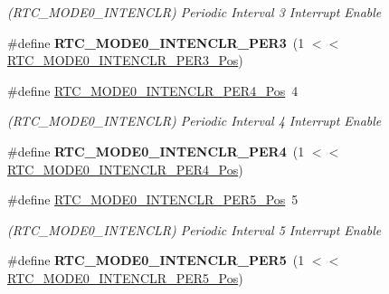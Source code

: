 \begin{DoxyCompactItemize}
\begin{DoxyCompactList}\small\item\em (R\+T\+C\+\_\+\+M\+O\+D\+E0\+\_\+\+I\+N\+T\+E\+N\+C\+L\+R) Periodic Interval 3 Interrupt Enable \end{DoxyCompactList}\item 
\hypertarget{group___s_a_m_l21___r_t_c_gac679977973e031111f5346b732fc22e0}{}\#define {\bfseries R\+T\+C\+\_\+\+M\+O\+D\+E0\+\_\+\+I\+N\+T\+E\+N\+C\+L\+R\+\_\+\+P\+E\+R3}~(1 $<$$<$ \hyperlink{group___s_a_m_l21___r_t_c_ga84f5a7551cac675023c5f13a856300fe}{R\+T\+C\+\_\+\+M\+O\+D\+E0\+\_\+\+I\+N\+T\+E\+N\+C\+L\+R\+\_\+\+P\+E\+R3\+\_\+\+Pos})\label{group___s_a_m_l21___r_t_c_gac679977973e031111f5346b732fc22e0}

\item 
\hypertarget{group___s_a_m_l21___r_t_c_gab00ed9c2cf22561110507ca5d1777753}{}\#define \hyperlink{group___s_a_m_l21___r_t_c_gab00ed9c2cf22561110507ca5d1777753}{R\+T\+C\+\_\+\+M\+O\+D\+E0\+\_\+\+I\+N\+T\+E\+N\+C\+L\+R\+\_\+\+P\+E\+R4\+\_\+\+Pos}~4\label{group___s_a_m_l21___r_t_c_gab00ed9c2cf22561110507ca5d1777753}

\begin{DoxyCompactList}\small\item\em (R\+T\+C\+\_\+\+M\+O\+D\+E0\+\_\+\+I\+N\+T\+E\+N\+C\+L\+R) Periodic Interval 4 Interrupt Enable \end{DoxyCompactList}\item 
\hypertarget{group___s_a_m_l21___r_t_c_gab9b2e1e76ec845f98396927378230979}{}\#define {\bfseries R\+T\+C\+\_\+\+M\+O\+D\+E0\+\_\+\+I\+N\+T\+E\+N\+C\+L\+R\+\_\+\+P\+E\+R4}~(1 $<$$<$ \hyperlink{group___s_a_m_l21___r_t_c_gab00ed9c2cf22561110507ca5d1777753}{R\+T\+C\+\_\+\+M\+O\+D\+E0\+\_\+\+I\+N\+T\+E\+N\+C\+L\+R\+\_\+\+P\+E\+R4\+\_\+\+Pos})\label{group___s_a_m_l21___r_t_c_gab9b2e1e76ec845f98396927378230979}

\item 
\hypertarget{group___s_a_m_l21___r_t_c_gae483dbd383d8fed0432d067ebc49e786}{}\#define \hyperlink{group___s_a_m_l21___r_t_c_gae483dbd383d8fed0432d067ebc49e786}{R\+T\+C\+\_\+\+M\+O\+D\+E0\+\_\+\+I\+N\+T\+E\+N\+C\+L\+R\+\_\+\+P\+E\+R5\+\_\+\+Pos}~5\label{group___s_a_m_l21___r_t_c_gae483dbd383d8fed0432d067ebc49e786}

\begin{DoxyCompactList}\small\item\em (R\+T\+C\+\_\+\+M\+O\+D\+E0\+\_\+\+I\+N\+T\+E\+N\+C\+L\+R) Periodic Interval 5 Interrupt Enable \end{DoxyCompactList}\item 
\hypertarget{group___s_a_m_l21___r_t_c_ga52aec2444c7bc8593a802f2b55d6cca1}{}\#define {\bfseries R\+T\+C\+\_\+\+M\+O\+D\+E0\+\_\+\+I\+N\+T\+E\+N\+C\+L\+R\+\_\+\+P\+E\+R5}~(1 $<$$<$ \hyperlink{group___s_a_m_l21___r_t_c_gae483dbd383d8fed0432d067ebc49e786}{R\+T\+C\+\_\+\+M\+O\+D\+E0\+\_\+\+I\+N\+T\+E\+N\+C\+L\+R\+\_\+\+P\+E\+R5\+\_\+\+Pos})\label{group___s_a_m_l21___r_t_c_ga52aec2444c7bc8593a802f2b55d6cca1}


\end{DoxyCompactItemize}
